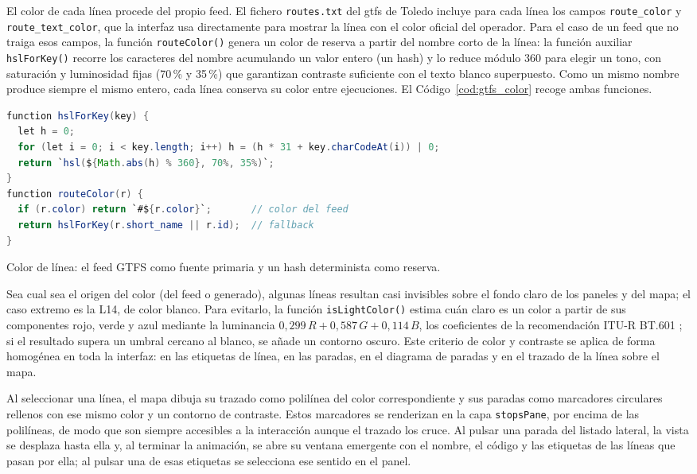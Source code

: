 El color de cada línea procede del propio feed. El fichero \texttt{routes.txt} del \gls{gtfs} de Toledo incluye para cada línea los campos \texttt{route\_color} y \texttt{route\_text\_color}, que la interfaz usa directamente para mostrar la línea con el color oficial del operador. Para el caso de un feed que no traiga esos campos, la función \texttt{routeColor()} genera un color de reserva a partir del nombre corto de la línea: la función auxiliar \texttt{hslForKey()} recorre los caracteres del nombre acumulando un valor entero (un hash) y lo reduce módulo 360 para elegir un tono, con saturación y luminosidad fijas (70\,\% y 35\,\%) que garantizan contraste suficiente con el texto blanco superpuesto. Como un mismo nombre produce siempre el mismo entero, cada línea conserva su color entre ejecuciones. El Código~\ref{cod:gtfs_color} recoge ambas funciones.

\begin{code}[H]
\begin{lstlisting}[language=Java]
function hslForKey(key) {
  let h = 0;
  for (let i = 0; i < key.length; i++) h = (h * 31 + key.charCodeAt(i)) | 0;
  return `hsl(${Math.abs(h) % 360}, 70%, 35%)`;
}
function routeColor(r) {
  if (r.color) return `#${r.color}`;       // color del feed
  return hslForKey(r.short_name || r.id);  // fallback
}
\end{lstlisting}
\caption{Color de línea: el feed GTFS como fuente primaria y un hash determinista como reserva.}
\label{cod:gtfs_color}
\end{code}

Sea cual sea el origen del color (del feed o generado), algunas líneas resultan casi invisibles sobre el fondo claro de los paneles y del mapa; el caso extremo es la L14, de color blanco. Para evitarlo, la función \texttt{isLightColor()} estima cuán claro es un color a partir de sus componentes rojo, verde y azul mediante la luminancia $0{,}299\,R + 0{,}587\,G + 0{,}114\,B$, los coeficientes de la recomendación ITU-R BT.601 \cite{ITU601BT601}; si el resultado supera un umbral cercano al blanco, se añade un contorno oscuro. Este criterio de color y contraste se aplica de forma homogénea en toda la interfaz: en las etiquetas de línea, en las paradas, en el diagrama de paradas y en el trazado de la línea sobre el mapa.\newline
\vspace{-5mm}

Al seleccionar una línea, el mapa dibuja su trazado como polilínea del color correspondiente y sus paradas como marcadores circulares rellenos con ese mismo color y un contorno de contraste. Estos marcadores se renderizan en la capa \texttt{stopsPane}, por encima de las polilíneas, de modo que son siempre accesibles a la interacción aunque el trazado los cruce. Al pulsar una parada del listado lateral, la vista se desplaza hasta ella y, al terminar la animación, se abre su ventana emergente con el nombre, el código y las etiquetas de las líneas que pasan por ella; al pulsar una de esas etiquetas se selecciona ese sentido en el panel.

